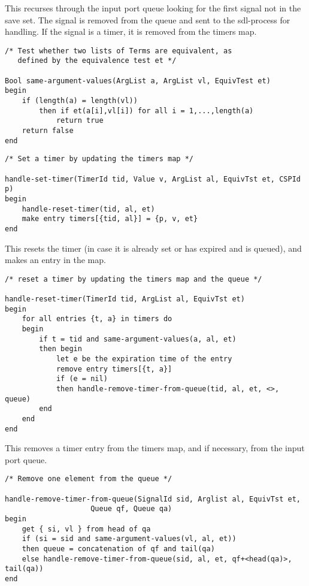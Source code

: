 This recurses through the input port queue looking for the first
signal not in the save set. The signal is removed from the queue and
sent to the sdl-process for handling. If the signal is a timer, it is
removed from the timers map.

\begin{verbatim}
/* Test whether two lists of Terms are equivalent, as
   defined by the equivalence test et */

Bool same-argument-values(ArgList a, ArgList vl, EquivTest et)
begin
    if (length(a) = length(vl))
        then if et(a[i],vl[i]) for all i = 1,...,length(a)
            return true
    return false
end
\end{verbatim}

\begin{verbatim}
/* Set a timer by updating the timers map */

handle-set-timer(TimerId tid, Value v, ArgList al, EquivTst et, CSPId p)
begin
    handle-reset-timer(tid, al, et)
    make entry timers[{tid, al}] = {p, v, et}
end
\end{verbatim}

This resets the timer (in case it is already set or has expired and
is queued), and makes an entry in the map.

\begin{verbatim}
/* reset a timer by updating the timers map and the queue */

handle-reset-timer(TimerId tid, ArgList al, EquivTst et)
begin
    for all entries {t, a} in timers do
    begin
        if t = tid and same-argument-values(a, al, et)
        then begin
            let e be the expiration time of the entry
            remove entry timers[{t, a}]
            if (e = nil)
            then handle-remove-timer-from-queue(tid, al, et, <>, queue)
        end
    end
end
\end{verbatim}

This removes a timer entry from the timers map, and if necessary,
from the input port queue.

\begin{verbatim}
/* Remove one element from the queue */

handle-remove-timer-from-queue(SignalId sid, Arglist al, EquivTst et,
                    Queue qf, Queue qa)
begin
    get { si, vl } from head of qa
    if (si = sid and same-argument-values(vl, al, et))
    then queue = concatenation of qf and tail(qa)
    else handle-remove-timer-from-queue(sid, al, et, qf+<head(qa)>, tail(qa))
end
\end{verbatim}

